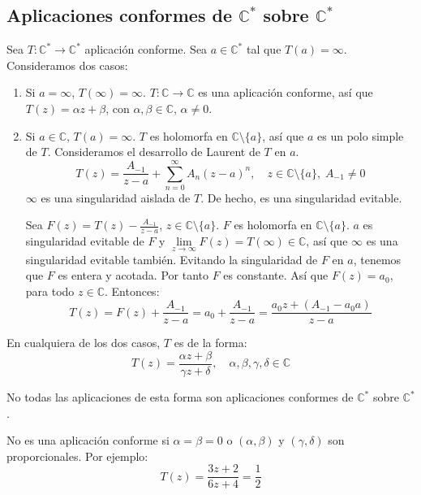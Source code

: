 \subsection*{Aplicaciones conformes de $\mathbb{C}^\ast$ sobre $\mathbb{C}^\ast$}
Sea $T: \mathbb{C}^\ast \to \mathbb{C}^\ast$ aplicación conforme.
Sea $a \in \mathbb{C}^\ast$ tal que $T(a) = \infty$.
Consideramos dos casos:
\begin{enumerate}
    \item Si $a = \infty$, $T(\infty) = \infty$.
          $T: \mathbb{C} \to \mathbb{C}$ es una aplicación conforme, así que $T(z) = \alpha z + \beta$, con $\alpha, \beta \in \mathbb{C}$, $\alpha \neq 0$.
    \item Si $a \in \mathbb{C}$, $T(a) = \infty$.
          $T$ es holomorfa en $\mathbb{C} \setminus \{a\}$, así que $a$ es un polo simple de $T$.
          Consideramos el desarrollo de Laurent de $T$ en $a$.
          $$T(z) = \frac{A_{-1}}{z-a} + \sum_{n=0}^\infty A_n(z-a)^n, \quad z \in \mathbb{C} \setminus \{a\}, \; A_{-1} \neq 0$$
          $\infty$ es una singularidad aislada de $T$.
          De hecho, es una singularidad evitable.

          Sea $F(z) = T(z) - \frac{A_{-1}}{z-a}$, $z \in \mathbb{C} \setminus \{a\}$.
          $F$ es holomorfa en $\mathbb{C} \setminus \{a\}$.
          $a$ es singularidad evitable de $F$ y $\lim\limits_{z \to \infty} F(z) = T(\infty) \in \mathbb{C}$, así que $\infty$ es una singularidad evitable también.
          Evitando la singularidad de $F$ en $a$, tenemos que $F$ es entera y acotada.
          Por tanto $F$ es constante.
          Así que $F(z) = a_0$, para todo $z \in \mathbb{C}$.
          Entonces:
          $$T(z) = F(z) + \frac{A_{-1}}{z-a} = a_0 + \frac{A_{-1}}{z-a} = \frac{a_0z + (A_{-1}-a_0a)}{z-a}$$
\end{enumerate}

En cualquiera de los dos casos, $T$ es de la forma:
$$T(z) = \frac{\alpha z + \beta}{\gamma z + \delta}, \quad \alpha, \beta, \gamma, \delta \in \mathbb{C}$$

No todas las aplicaciones de esta forma son aplicaciones conformes de $\mathbb{C}^\ast$ sobre $\mathbb{C}^\ast$.

\begin{example}[Contraejemplo]
    No es una aplicación conforme si $\alpha = \beta = 0$ o $(\alpha, \beta)$ y $(\gamma, \delta)$ son proporcionales.
    Por ejemplo:
    $$T(z) = \frac{3z + 2}{6z + 4} = \frac{1}{2}$$
\end{example}

